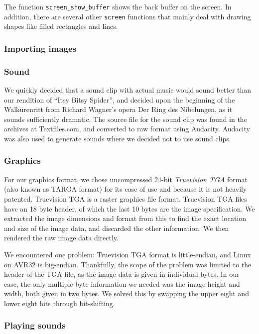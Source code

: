 

The function \texttt{screen\_show\_buffer} shows the back buffer on the
screen. In addition, there are several other \texttt{screen} functions
that mainly deal with drawing shapes like filled rectangles and lines.

\subsubsection{Importing images}


\subsubsection{Sound}
We quickly decided that a sound clip with actual music would sound better than our rendition of ``Itsy Bitsy Spider'', and decided upon the beginning of the Walkürenritt from Richard Wagner's opera Der Ring des Nibelungen, as it sounds sufficiently dramatic. The source file for the sound clip was found in the archives at Textfiles.com, and converted to raw format using Audacity. Audacity was also used to generate sounds where we decided not to use sound clips.

\subsubsection{Graphics}
For our graphics format, we chose uncompressed 24-bit \emph{Truevision TGA} format (also known as TARGA format) for its ease of use and because it is not heavily patented. Truevision TGA is a raster graphics file format. Truevision TGA files have an 18 byte header, of which the last 10 bytes are the image specification. We extracted the image dimensions and format from this to find the exact location and size of the image data, and discarded the other information. We then rendered the raw image data directly. %

We encountered one problem: Truevision TGA format is little-endian, and Linux on AVR32 is big-endian. Thankfully, the scope of the problem was limited to the header of the TGA file, as the image data is given in individual bytes. In our case, the only multiple-byte information we needed was the image height and width, both given in two bytes. We solved this by swapping the upper eight and lower eight bits through bit-shifting.

\subsubsection{Playing sounds}

